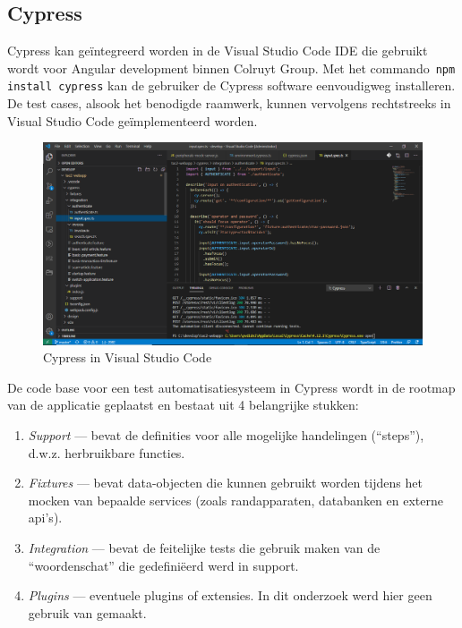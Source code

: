 
\chapter{}
\label{ch:corpus}

\section{Cypress}

Cypress kan geïntegreerd worden in de Visual Studio Code IDE die gebruikt wordt voor Angular development binnen Colruyt Group. Met het commando~\texttt{npm install cypress} kan de gebruiker de Cypress software eenvoudigweg installeren. De test cases, alsook het benodigde raamwerk, kunnen vervolgens rechtstreeks in Visual Studio Code geïmplementeerd worden.

\begin{figure}[h!]
    \centering
    \includegraphics[scale=0.35]{img/corpus/Cypress-In-Visual-Studio.PNG}
    \caption{Cypress in Visual Studio Code}
    \label{fig:CypressInVS}
\end{figure}

De code base voor een test automatisatiesysteem in Cypress wordt in de rootmap van de applicatie geplaatst en bestaat uit 4 belangrijke stukken:

\begin{enumerate}
    \item \emph{Support} — bevat de definities voor alle mogelijke handelingen (``steps''), d.w.z. herbruikbare functies.
    \item \emph{Fixtures} — bevat data-objecten die kunnen gebruikt worden tijdens het mocken van bepaalde services (zoals randapparaten, databanken en externe api's).
    \item \emph{Integration} — bevat de feitelijke tests die gebruik maken van de ``woordenschat'' die gedefiniëerd werd in support.
    \item \emph{Plugins} — eventuele plugins of extensies. In dit onderzoek werd hier geen gebruik van gemaakt.
\end{enumerate}

